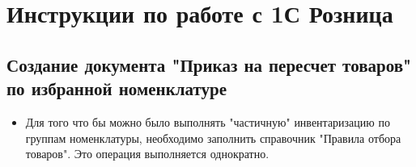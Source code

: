 \section{Инструкции по работе с 1С Розница}

\subsection{Создание документа "Приказ на пересчет товаров" по избранной номенклатуре}

\begin{itemize}
	\item Для того что бы можно было выполнять "частичную" инвентаризацию по группам номенклатуры, необходимо заполнить справочник "Правила отбора товаров".   Это операция выполняется однократно. 
\end{itemize}	
